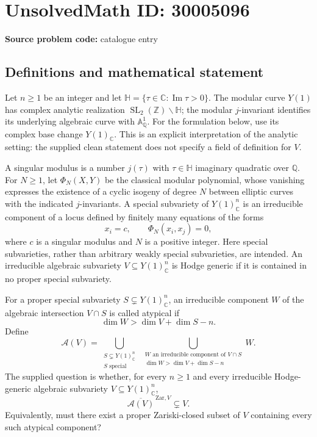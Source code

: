 \documentclass[11pt]{article}
\newcommand{\Z}{\mathbb{Z}}
\newcommand{\Q}{\mathbb{Q}}
\newcommand{\C}{\mathbb{C}}
\newcommand{\A}{\mathbb{A}}
\begin{document}
\section*{UnsolvedMath ID: 30005096}
\textbf{Source problem code:} catalogue entry
\subsection{Definitions and mathematical statement}
Let \(n\geq 1\) be an integer and let \(\mathbb H=\{\tau\in\C:\operatorname{Im}\tau>0\}\). The modular curve \(Y(1)\) has complex analytic realization \(\operatorname{SL}_2(\Z)\backslash\mathbb H\); the modular \(j\)-invariant identifies its underlying algebraic curve with \(\A^1_{\Q}\). For the formulation below, use its complex base change \(Y(1)_{\C}\). This is an explicit interpretation of the analytic setting: the supplied clean statement does not specify a field of definition for \(V\).

A singular modulus is a number \(j(\tau)\) with \(\tau\in\mathbb H\) imaginary quadratic over \(\Q\). For \(N\geq1\), let \(\Phi_N(X,Y)\) be the classical modular polynomial, whose vanishing expresses the existence of a cyclic isogeny of degree \(N\) between elliptic curves with the indicated \(j\)-invariants. A special subvariety of \(Y(1)_{\C}^{n}\) is an irreducible component of a locus defined by finitely many equations of the forms
\[
 x_i=c,\qquad \Phi_N(x_i,x_j)=0,
\]
where \(c\) is a singular modulus and \(N\) is a positive integer. Here special subvarieties, rather than arbitrary weakly special subvarieties, are intended. An irreducible algebraic subvariety \(V\subseteq Y(1)_{\C}^{n}\) is Hodge generic if it is contained in no proper special subvariety.

For a proper special subvariety \(S\subsetneq Y(1)_{\C}^{n}\), an irreducible component \(W\) of the algebraic intersection \(V\cap S\) is called atypical if
\[
 \dim W>\dim V+\dim S-n.
\]
Define
\[
 \mathcal A(V)=
 \bigcup_{\substack{S\subsetneq Y(1)_{\C}^{n}\\S\text{ special}}}
 \ \bigcup_{\substack{W\text{ an irreducible component of }V\cap S\\
 \dim W>\dim V+\dim S-n}}W.
\]
The supplied question is whether, for every \(n\geq1\) and every irreducible Hodge-generic algebraic subvariety \(V\subseteq Y(1)_{\C}^{n}\),
\[
 \overline{\mathcal A(V)}^{\,\mathrm{Zar},V}\subsetneq V.
\]
Equivalently, must there exist a proper Zariski-closed subset of \(V\) containing every such atypical component?
\end{document}
